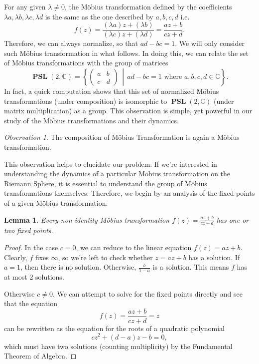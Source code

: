 \documentclass{amsart}
\newcommand{\bbC}{\mathbb{C}}
\newcommand{\PSL}{\operatorname{\textbf{PSL}}}
\newtheorem{lem}[thm]{Lemma}
\theoremstyle{definition}
\theoremstyle{remark}
\newtheorem{obs}[thm]{Observation}
\numberwithin{equation}{section}
\begin{document}
For any given $\lambda\neq 0$, the M\"obius transformation defined by the coefficients $\lambda a, \lambda b, \lambda c, \lambda d$ is the same as the one described by $a,b,c,d$ i.e.
  \[
f(z)=\frac{(\lambda a )z+(\lambda b)}{(\lambda c)z+(\lambda d)}=\frac{az+b}{cz+d}.
  \]
Therefore, we can always normalize, so that $ad-bc=1$. We will only consider such M\"obius transformation in what follows. In doing this, we can relate the set of M\"obius transformations with the group of matrices
\[
\PSL(2,\bbC)=\left\{  \begin{pmatrix}
a & b\\
c & d
\end{pmatrix} \,\middle\vert\, ad-bc=1 \text{ where $a,b,c,d\in\bbC$}\right\}.
\]
In fact, a quick computation shows that this set of normalized M\"obius transformations (under composition) is isomorphic to $\PSL(2,\bbC)$ (under matrix multiplication) as a group. This observation is simple, yet powerful in our study of the M\"obius transformations and their dynamics.

\begin{obs}
The composition of M\"obius Transformation is again a M\"obius transformation.
\end{obs}

This observation helps to elucidate our problem. If we're interested in understanding the dynamics of a particular M\"obius transformation on the Riemann Sphere, it is essential to understand the group of M\"obius transformations themselves. Therefore, we begin by an analysis of the fixed points of a given M\"obius transformation.

\begin{lem}
  Every non-identity M\"obius transformation $f(z)=\frac{az+b}{cz+d}$ has one or two fixed points.
\end{lem}

\begin{proof}
  In the case $c=0$, we can reduce to the linear equation $f(z)=az+b$. Clearly, $f$ fixes $\infty$, so we're left to check whether $z=az+b$ has a solution. If $a=1$, then there is no solution. Otherwise, $\frac{b}{1-a}$ is a solution. This means $f$ has at most 2 solutions.

Otherwise $c\neq 0$. We can attempt to solve for the fixed points directly and see that the equation
\[
f(z)=\frac{az+b}{cz+d}=z
\]
can be rewritten as the equation for the roots of a quadratic polynomial
\[
cz^2+(d-a)z-b=0,
 \]
 which must have two solutions (counting multiplicity) by the Fundamental Theorem of Algebra.

\end{proof}
\end{document}
